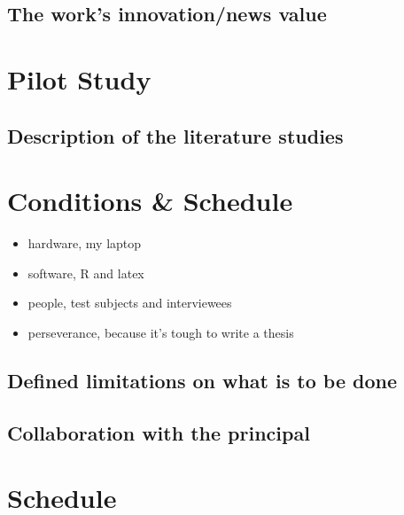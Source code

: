 \documentclass[12pt]{article}
\begin{document}

\subsection*{The work's innovation/news value}


\section*{Pilot Study}

\subsection*{Description of the literature studies}


\section*{Conditions \& Schedule}

\begin{itemize}
 \item hardware, my laptop
 \item software, R and latex
 \item people, test subjects and interviewees
 \item perseverance, because it's tough to write a thesis
\end{itemize}

\subsection*{Defined limitations on what is to be done}


\subsection*{Collaboration with the principal}


\newpage
\section*{Schedule}

\end{document}
